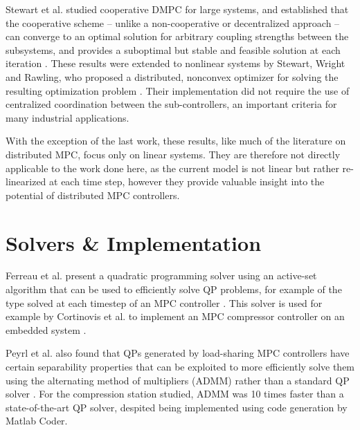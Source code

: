 Stewart et al. studied cooperative DMPC for large systems, and established that the cooperative scheme -- unlike a non-cooperative or decentralized approach -- can converge to an optimal solution for arbitrary coupling strengths between the subsystems, and provides a suboptimal but stable and feasible solution at each iteration \cite{Stewart2010}.
These results were extended to nonlinear systems by Stewart, Wright and Rawling, who proposed a distributed, nonconvex optimizer for solving the resulting optimization problem \cite{Stewart2011}.
Their implementation did not require the use of centralized coordination between the sub-controllers, an important criteria for many industrial applications.

With the exception of the last work, these results, like much of the literature on distributed MPC, focus only on linear systems. 
They are therefore not directly applicable to the work done here, as the current model is not linear but rather re-linearized at each time step, however they provide valuable insight into the potential of distributed MPC controllers.


\section{Solvers \& Implementation}

Ferreau et al. present a quadratic programming solver using an active-set algorithm that can be used to efficiently solve QP problems, for example of the type solved at each timestep of an MPC controller \cite{Ferreau2014}. 
This solver is used for example by Cortinovis et al. to implement an MPC compressor controller on an embedded system \cite{Cortinovis2015}. 

Peyrl et al. also found that QPs generated by load-sharing MPC controllers have certain separability properties that can be exploited to more efficiently solve them using the alternating method of multipliers (ADMM) rather than a standard QP solver \cite{Peyrl2015}. For the compression station studied, ADMM was 10 times faster than a state-of-the-art QP solver, despited being implemented using code generation by Matlab Coder.







